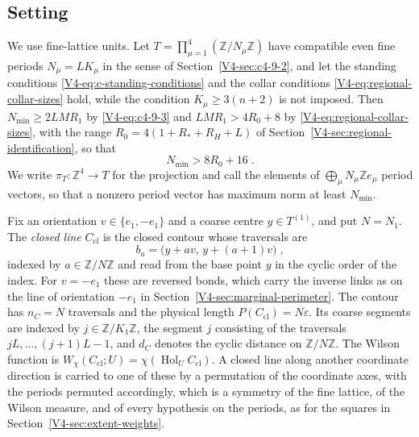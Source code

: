 \documentclass[11pt]{article}
\newcommand{\Hol}{\operatorname{Hol}}
\numberwithin{equation}{section}
\theoremstyle{remark}
\theoremstyle{plain}
\begin{document}
\subsection{Setting}\label{sec:closed-line-setting}

We use fine-lattice units. Let $T=\prod_{\mu=1}^4(\mathbb Z/N_{\mu}\mathbb Z)$ have compatible even fine periods $N_{\mu}= LK_{\mu}$ in the sense of Section~\ref{V4-sec:c4-9-2}, and let the standing conditions \eqref{V4-eq:c-standing-conditions} and the collar conditions \eqref{V4-eq:regional-collar-sizes} hold, while the condition $K_{\mu}\geqslant 3(n+2)$ is not imposed. Then $N_{\min}\geqslant 2LMR_1$ by \eqref{V4-eq:c4-9-3} and $LMR_1>4R_0+8$ by \eqref{V4-eq:regional-collar-sizes}, with the range $R_0=4(1+R_*+R_H+L)$ of Section~\ref{V4-sec:regional-identification}, so that
\begin{equation}\label{eq:closed-line-period}
    N_{\min}>8R_0+16\;.
\end{equation}
We write $\pi_T \colon \mathbb Z^4\to T$ for the projection and call the elements of $\bigoplus_{\mu}N_{\mu}\mathbb Ze_{\mu}$ period vectors, so that a nonzero period vector has maximum norm at least $N_{\min}$.

Fix an orientation $v\in\{ e_1,-e_1\}$ and a coarse centre $y\in T^{(1)}$, and put $N= N_1$. The \emph{closed line} $C_{\mathrm{cl}}$ is the closed contour whose traversals are
\begin{equation}\label{eq:closed-line-traversals}
    b_a=\bigl(y+av,\,y+(a+1)v\bigr)\;,
\end{equation}
indexed by $a\in\mathbb Z/N\mathbb Z$ and read from the base point $y$ in the cyclic order of the index. For $v=-e_1$ these are reversed bonds, which carry the inverse links as on the line of orientation $-e_1$ in Section~\ref{V4-sec:marginal-perimeter}. The contour has $n_C= N$ traversals and the physical length $P(C_{\mathrm{cl}})= N\varepsilon$. Its coarse segments are indexed by $j\in\mathbb Z/K_1\mathbb Z$, the segment $j$ consisting of the traversals $jL,\ldots,(j+1)L-1$, and $d_C$ denotes the cyclic distance on $\mathbb Z/N\mathbb Z$. The Wilson function is $W_{\chi}(C_{\mathrm{cl}};U)=\chi(\Hol_UC_{\mathrm{cl}})$. A closed line along another coordinate direction is carried to one of these by a permutation of the coordinate axes, with the periods permuted accordingly, which is a symmetry of the fine lattice, of the Wilson measure, and of every hypothesis on the periods, as for the squares in Section~\ref{V4-sec:extent-weights}.
\end{document}
